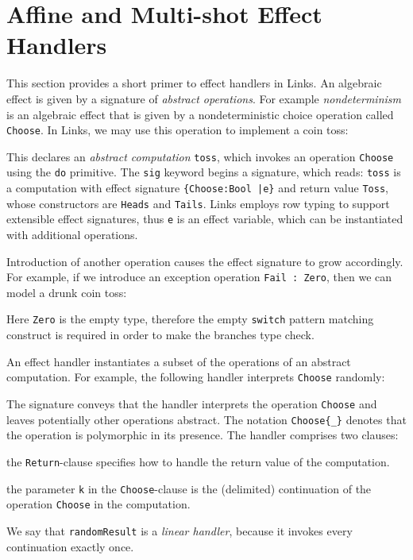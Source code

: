 \documentclass[preprint,numbers]{sigplanconf}
\begin{document}
\section{Affine and Multi-shot Effect Handlers}
This section provides a short primer to effect handlers in Links. An algebraic
effect is given by a signature of \emph{abstract operations}. For example
\emph{nondeterminism} is an algebraic effect that is given by a
nondeterministic choice operation called \lstinline$Choose$. In Links, we may
use this operation to implement a coin toss:
%

%
This declares an \emph{abstract computation} \lstinline$toss$, which invokes an
operation \lstinline$Choose$ using the \lstinline$do$ primitive.  The
\lstinline$sig$ keyword begins a signature, which reads: \lstinline$toss$ is a
computation with effect signature \lstinline${Choose:Bool |e}$ and return value
\lstinline$Toss$, whose constructors are \lstinline$Heads$ and
\lstinline$Tails$.  Links employs row typing to support extensible effect
signatures, thus \lstinline$e$ is an effect variable, which can be instantiated
with additional operations.

Introduction of another operation causes the effect signature to grow
accordingly. For example, if we introduce an exception operation
\lstinline$Fail : Zero$, then we can model a drunk coin toss:
%

%
Here \lstinline$Zero$ is the empty type, therefore the empty
\lstinline$switch$ pattern matching construct is required in order to
make the branches type check.

An effect handler instantiates a subset of the operations of an
abstract computation. For example, the following handler interprets
\lstinline$Choose$ randomly:
%

%
The signature conveys that the handler interprets the operation
\lstinline$Choose$ and leaves potentially other operations
abstract. The notation \lstinline$Choose{_}$ denotes that the
operation is polymorphic in its presence.  The handler comprises two
clauses:
\begin{enumerate*}[label={\roman*)}]
\item the \lstinline$Return$-clause specifies how to handle the return
  value of the computation.
\item the parameter \lstinline$k$ in the \lstinline$Choose$-clause is
  the (delimited) continuation of the operation \lstinline$Choose$ in the
  computation.
\end{enumerate*}
We say that \lstinline$randomResult$ is a \emph{linear handler}, because
it invokes every continuation exactly once.
\end{document}

